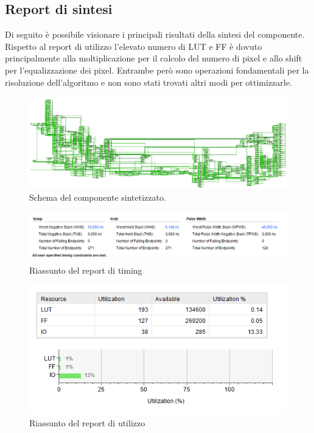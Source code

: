 \documentclass{article}
\begin{document}
\pagebreak

\subsection{Report di sintesi}
Di seguito è possibile visionare i principali risultati della sintesi del componente. Rispetto al report di utilizzo l'elevato numero di LUT e FF è dovuto principalmente alla moltiplicazione per il calcolo del numero di pixel e allo shift per l'equalizzazione dei pixel. Entrambe però sono operazioni fondamentali per la risoluzione dell'algoritmo e non sono stati trovati altri modi per ottimizzarle.

\begin{figure}[h]
    \includegraphics[width=\textwidth]{schema.png}
    \centering
    \caption{Schema del componente sintetizzato.}
\end{figure}

\begin{figure}[h]
    \includegraphics[width=\textwidth]{timing.png}
    \centering
    \caption{Riassunto del report di timing}
\end{figure}

\begin{figure}[h]
    \includegraphics[scale=0.5]{utilization.png}
    \centering
    \caption{Riassunto del report di utilizzo}
\end{figure}
\end{document}
